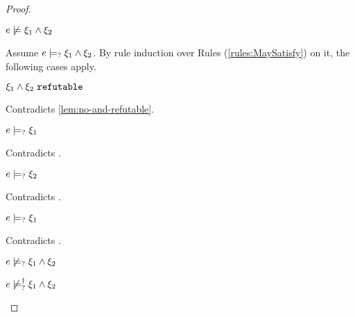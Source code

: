 \begin{proof}
\begin{byCases}
\begin{byCases}
\begin{byCases}
        \end{byCases}
        \begin{pfsteps*}
        \item $e \not\models \xi_1 \wedge \xi_2$  
        \end{pfsteps*}
        Assume $e \models_{?} \xi_1 \wedge \xi_2$. By rule induction over Rules (\ref{rules:MaySatisfy}) on it, the following cases apply.
        \begin{byCases}
        \item[\text{(\ref{rule:CMSNotVal})}]
            \begin{pfsteps*}
            \item $\xi_1 \wedge \xi_2 ~\mathtt{refutable}$ 
            \end{pfsteps*}
            Contradicts \autoref{lem:no-and-refutable}.
        \item[\text{(\ref{rule:CMSAnd1})}]
            \begin{pfsteps*}
            \item $e \models_{?} \xi_1$ 
            \end{pfsteps*}
            Contradicts .
        \item[\text{(\ref{rule:CMSAnd2})}]
            \begin{pfsteps*}
            \item $e \models_{?} \xi_2$ 
            \end{pfsteps*}
            Contradicts .
        \item[\text{(\ref{rule:CMSAnd3})}]
            \begin{pfsteps*}
            \item $e \models_{?} \xi_1$ 
            \end{pfsteps*}
            Contradicts .
        \end{byCases}
        \begin{pfsteps*}
        \item $e \not\models_{?} \xi_1 \wedge \xi_2$  
        \item $e \not\models_{?}^{\dag} \xi_1 \wedge \xi_2$ 
        \end{pfsteps*}

\end{byCases}
\end{byCases}
\end{proof}
